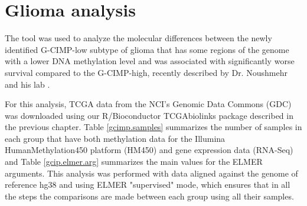 
\section{Glioma analysis}

The 
tool was used to analyze the molecular differences between the newly
identified G-CIMP-low subtype of glioma that has some regions of the genome with a lower
DNA methylation level and was associated with significantly
worse survival compared to the G-CIMP-high, recently described by Dr. Noushmehr
and his lab \cite{ceccarelli2016molecular}.

For this analysis, TCGA data from the NCI's Genomic Data Commons (GDC) was
downloaded using our R/Bioconductor TCGAbiolinks package described in the previous chapter.
Table \ref{gcimp.samples} summarizes the number of samples in each group that have both 
methylation data for the Illumina HumanMethylation450 platform (HM450) and gene expression data
(RNA-Seq) and Table \ref{gcip.elmer.arg} summarizes the main values for the ELMER arguments.
This analysis was performed with data aligned against the genome of reference hg38 and
using ELMER "supervised" mode, which ensures that in all the steps the
comparisons are made between each group using all their samples.

